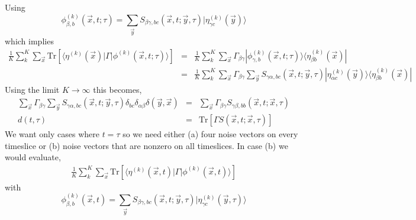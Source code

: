 \documentclass[3p,preprint]{elsarticle}
\begin{document}
Using 
\begin{equation}
\phi^{(k)}_{\beta, b}(\vec{x}, t; \tau) = \sum_{\vec{y}} S_{\beta\gamma,b c} (\vec{x}, t; \vec{y}, \tau) | \eta^{(k)}_{\gamma c }(\vec{y})\rangle
\end{equation}
which implies
\begin{eqnarray}
\frac{1}{K} \sum_{k}^K \sum_{\vec{x}} \text{Tr} \left[ \langle \eta^{(k)}(\vec{x}) | \Gamma | \phi^{(k)} (\vec{x}, t; \tau) \rangle \right] &=& \frac{1}{K} \sum_{k}^K \sum_{\vec{x}} \Gamma_{\beta \gamma} | \phi^{(k)}_{\gamma, b}(\vec{x}, t; \tau) \rangle \langle \eta^{(k)}_{\beta b }(\vec{x}) | \\
 &=& \frac{1}{K} \sum_{k}^K \sum_{\vec{x}} \Gamma_{\beta \gamma} \sum_{\vec{y}} S_{\gamma \alpha,b c} (\vec{x}, t; \vec{y}, \tau) 
| \eta^{(k)}_{\alpha c }(\vec{y})\rangle \langle \eta^{(k)}_{\beta b }(\vec{x}) |
\end{eqnarray}
Using the limit $K \rightarrow \infty$ this becomes,
\begin{eqnarray}
\sum_{\vec{x}} \Gamma_{\beta \gamma} \sum_{\vec{y}} S_{\gamma \alpha,b c} (\vec{x}, t; \vec{y}, \tau) 
\delta_{bc} \delta_{\alpha \beta} \delta(\vec{y}, \vec{x}) &=& 
\sum_{\vec{x}} \Gamma_{\beta \gamma} S_{\gamma \beta,b b} (\vec{x}, t; \vec{x}, \tau) \\
d(t, \tau) &=& \text{Tr} \left[ \Gamma S(\vec{x}, t; \vec{x}, \tau) \right]
\end{eqnarray}
We want only cases where $t = \tau$ so we need either (a) four noise vectors on every timeslice or
(b) noise vectors that are nonzero on all timeslices. In case (b) we would evaluate,
\begin{eqnarray}
\frac{1}{K} \sum_{k}^K \sum_{\vec{x}} \text{Tr} \left[ \langle \eta^{(k)}(\vec{x}, t) | \Gamma | \phi^{(k)} (\vec{x}, t) \rangle \right] 
\end{eqnarray}
with
\begin{equation}
\phi^{(k)}_{\beta, b}(\vec{x}, t) = \sum_{\vec{y}} S_{\beta\gamma,b c} (\vec{x}, t; \vec{y}, \tau) | \eta^{(k)}_{\gamma c }(\vec{y}, \tau)\rangle
\end{equation}
\end{document}
